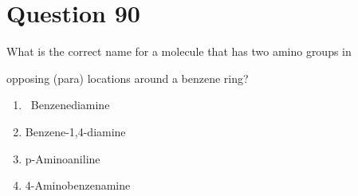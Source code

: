 \documentclass{article}
\begin{document}
\section*{Question 90}
{What is the correct name for a molecule that has two amino groups in

opposing (para) locations around a benzene ring?}


\begin{enumerate}[label=(\alph*)]
\item {~Benzenediamine}


\item {Benzene-1,4-diamine}


\item {p-Aminoaniline}


\item {4-Aminobenzenamine}


\end{enumerate}
\newpage
\end{document}
